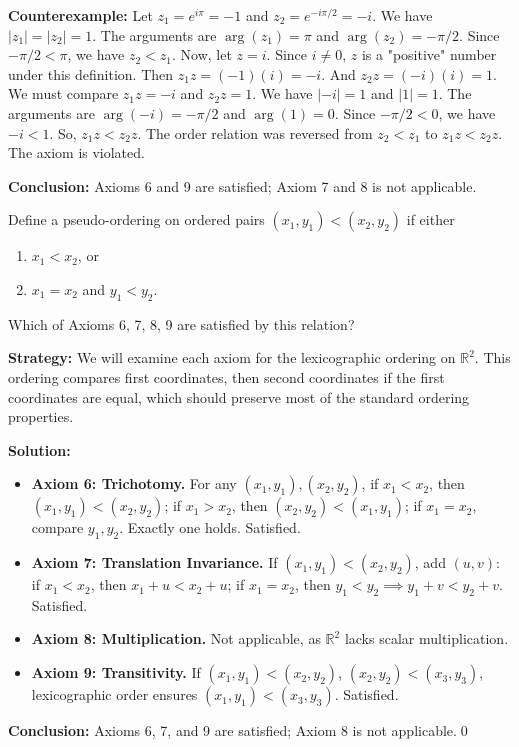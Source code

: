 \begin{itemize}
    \textbf{Counterexample:} Let $z_1 = e^{i\pi} = -1$ and $z_2 = e^{-i\pi/2} = -i$.
    We have $|z_1| = |z_2| = 1$. The arguments are $\arg(z_1) = \pi$ and $\arg(z_2) = -\pi/2$. Since $-\pi/2 < \pi$, we have $z_2 < z_1$.
    Now, let $z = i$. Since $i \neq 0$, $z$ is a "positive" number under this definition.
    Then $z_1 z = (-1)(i) = -i$.
    And $z_2 z = (-i)(i) = 1$.
    We must compare $z_1 z = -i$ and $z_2 z = 1$.
    We have $|-i|=1$ and $|1|=1$. The arguments are $\arg(-i) = -\pi/2$ and $\arg(1) = 0$. Since $-\pi/2 < 0$, we have $-i < 1$.
    So, $z_1 z < z_2 z$. The order relation was reversed from $z_2 < z_1$ to $z_1 z < z_2 z$. The axiom is violated.
\end{itemize}
\textbf{Conclusion:} Axioms 6 and 9 are satisfied; Axiom 7 and 8 is not applicable.



\begin{problembox}
\begin{problemstatement}
Define a pseudo-ordering on ordered pairs \((x_1, y_1) < (x_2, y_2)\) if either
\begin{enumerate}[label=(\roman*)]
\item \(x_1 < x_2\), or
\item \(x_1 = x_2\) and \(y_1 < y_2\).
\end{enumerate}
Which of Axioms 6, 7, 8, 9 are satisfied by this relation?
\end{problemstatement}
\end{problembox}

\noindent\textbf{Strategy:} We will examine each axiom for the lexicographic ordering on $\mathbb{R}^2$. This ordering compares first coordinates, then second coordinates if the first coordinates are equal, which should preserve most of the standard ordering properties.

\bigskip\noindent\textbf{Solution:}
\begin{itemize}
\item \textbf{Axiom 6: Trichotomy.} For any \( (x_1, y_1), (x_2, y_2) \), if \( x_1 < x_2 \), then \( (x_1, y_1) < (x_2, y_2) \); if \( x_1 > x_2 \), then \( (x_2, y_2) < (x_1, y_1) \); if \( x_1 = x_2 \), compare \( y_1, y_2 \). Exactly one holds. Satisfied.
\item \textbf{Axiom 7: Translation Invariance.} If \( (x_1, y_1) < (x_2, y_2) \), add \( (u, v) \): if \( x_1 < x_2 \), then \( x_1 + u < x_2 + u \); if \( x_1 = x_2 \), then \( y_1 < y_2 \implies y_1 + v < y_2 + v \). Satisfied.
\item \textbf{Axiom 8: Multiplication.} Not applicable, as \( \mathbb{R}^2 \) lacks scalar multiplication.
\item \textbf{Axiom 9: Transitivity.} If \( (x_1, y_1) < (x_2, y_2) \), \( (x_2, y_2) < (x_3, y_3) \), lexicographic order ensures \( (x_1, y_1) < (x_3, y_3) \). Satisfied.
\end{itemize}
\textbf{Conclusion:} Axioms 6, 7, and 9 are satisfied; Axiom 8 is not applicable.\qed


